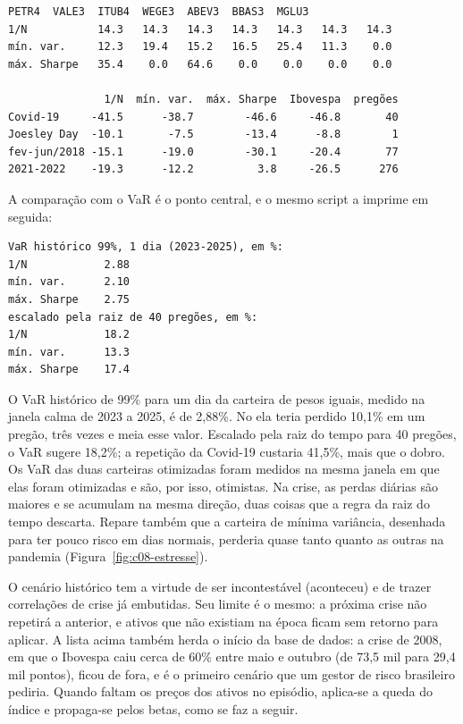 
\begin{lstlisting}[style=saida]
             PETR4  VALE3  ITUB4  WEGE3  ABEV3  BBAS3  MGLU3
1/N           14.3   14.3   14.3   14.3   14.3   14.3   14.3
mín. var.     12.3   19.4   15.2   16.5   25.4   11.3    0.0
máx. Sharpe   35.4    0.0   64.6    0.0    0.0    0.0    0.0

               1/N  mín. var.  máx. Sharpe  Ibovespa  pregões
Covid-19     -41.5      -38.7        -46.6     -46.8       40
Joesley Day  -10.1       -7.5        -13.4      -8.8        1
fev-jun/2018 -15.1      -19.0        -30.1     -20.4       77
2021-2022    -19.3      -12.2          3.8     -26.5      276
\end{lstlisting}

A comparação com o VaR é o ponto central, e o mesmo script a imprime em seguida:

\begin{lstlisting}[style=saida]
VaR histórico 99%, 1 dia (2023-2025), em %:
1/N            2.88
mín. var.      2.10
máx. Sharpe    2.75
escalado pela raiz de 40 pregões, em %:
1/N            18.2
mín. var.      13.3
máx. Sharpe    17.4
\end{lstlisting}

O VaR histórico de 99\% para um dia da carteira de pesos iguais, medido na janela calma de 2023 a 2025, é de 2,88\%. No  ela teria perdido 10,1\% em um pregão, três vezes e meia esse valor. Escalado pela raiz do tempo para 40 pregões, o VaR sugere 18,2\%; a repetição da Covid-19 custaria 41,5\%, mais que o dobro. Os VaR das duas carteiras otimizadas foram medidos na mesma janela em que elas foram otimizadas e são, por isso, otimistas. Na crise, as perdas diárias são maiores e se acumulam na mesma direção, duas coisas que a regra da raiz do tempo descarta. Repare também que a carteira de mínima variância, desenhada para ter pouco risco em dias normais, perderia quase tanto quanto as outras na pandemia (Figura~\ref{fig:c08-estresse}).

O cenário histórico tem a virtude de ser incontestável (aconteceu) e de trazer correlações de crise já embutidas. Seu limite é o mesmo: a próxima crise não repetirá a anterior, e ativos que não existiam na época ficam sem retorno para aplicar. A lista acima também herda o início da base de dados: a crise de 2008, em que o Ibovespa caiu cerca de 60\% entre maio e outubro (de 73,5 mil para 29,4 mil pontos), ficou de fora, e é o primeiro cenário que um gestor de risco brasileiro pediria. Quando faltam os preços dos ativos no episódio, aplica-se a queda do índice e propaga-se pelos betas, como se faz a seguir.

